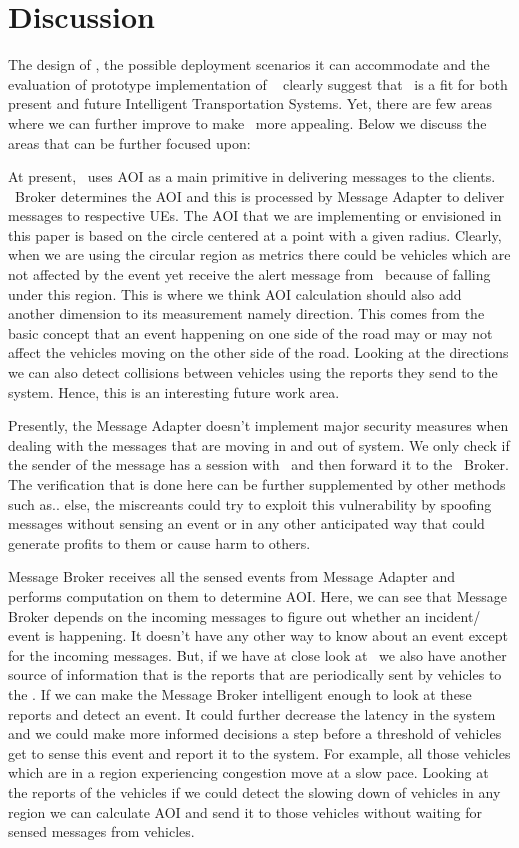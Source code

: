 \section{Discussion}

The design of \name, the possible deployment scenarios it can
accommodate and the evaluation of prototype implementation of \name~
clearly suggest that \name~is a fit for both present and future
Intelligent Transportation Systems. Yet, there are few areas where we
can further improve to make \name~more appealing. Below we discuss
the areas that can be further focused upon:

At present, \name~uses AOI as a main primitive in delivering
messages to the clients. \name~Broker determines the AOI and this is
processed by Message Adapter to deliver messages to respective UEs.
The AOI that we are implementing or envisioned in this paper is based
on the circle centered at a point with a given radius. Clearly, when
we are using the circular region as metrics there could be vehicles
which are not affected by the event yet receive the alert message from
\name~because of falling under this region. This is where we think
AOI calculation should also add another dimension to its measurement
namely direction. This comes from the basic concept that an event
happening on one side of the road may or may not affect the vehicles
moving on the other side of the road. Looking at the directions we can
also detect collisions between vehicles using the reports they send to
the system.  Hence, this is an interesting future work area.

Presently, the Message Adapter doesn't implement major security
measures when dealing with the messages that are moving in and out of
system. We only check if the sender of the message has a session with
\name~and then forward it to the \name~Broker. The verification
that is done here can be further supplemented by other methods such
as.. else, the miscreants could try to exploit this vulnerability by
spoofing messages without sensing an event or in any other anticipated
way that could generate profits to them or cause harm to others.

Message Broker receives all the sensed events from Message Adapter and
performs computation on them to determine AOI. Here, we can see that
Message Broker depends on the incoming messages to figure out whether
an incident/ event is happening. It doesn't have any other way to know
about an event except for the incoming messages. But, if we have at
close look at \name~we also have another source of information that
is the reports that are periodically sent by vehicles to the
\name. If we can make the Message Broker intelligent enough to look
at these reports and detect an event. It could further decrease the
latency in the system and we could make more informed decisions a step
before a threshold of vehicles get to sense this event and report it
to the system. For example, all those vehicles which are in a region
experiencing congestion move at a slow pace. Looking at the reports of
the vehicles if we could detect the slowing down of vehicles in any
region we can calculate AOI and send it to those vehicles without
waiting for sensed messages from vehicles.

